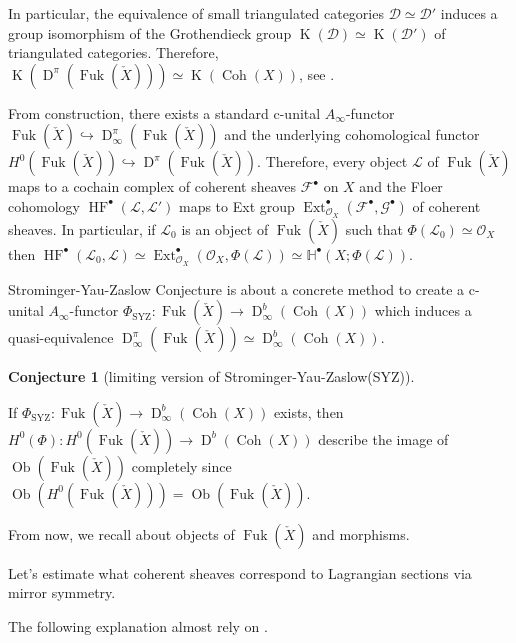 \documentclass[a4paper,dvipdfmx,reqno,12pt]{amsart}
\theoremstyle{definition}
\newtheorem{Conj}[Thm]{Conjecture}
\newcommand{\mb}[1]{\mathbb{#1}}%
\newcommand{\mcal}[1]{\mathcal{#1}}%
\newcommand{\opn}[1]{\operatorname{#1}}
\newcommand{\hookto}{\hookrightarrow}
\numberwithin{equation}{section}
\begin{document}
In particular, the equivalence of small triangulated categories
$\mcal{D}\simeq \mcal{D}'$ induces a group isomorphism of
the Grothendieck group $\opn{K}(\mcal{D})\simeq \opn{K}(\mcal{D}')$
of triangulated categories.
Therefore, $\opn{K}(\opn{D}^{\pi}(\opn{Fuk}(\check{X})))\simeq \opn{K}(\opn{Coh}(X))$, see \cite[Exercise I.27]{}.

From construction, there exists a standard c-unital $A_{\infty}$-functor $\opn{Fuk}(\check{X})\hookto \opn{D}^{\pi}_{\infty}(\opn{Fuk}(\check{X}))$ and the underlying cohomological functor $H^{0}(\opn{Fuk}(\check{X})) \hookto \opn{D}^{\pi}(\opn{Fuk}(\check{X}))$.
Therefore, every object $\mathscr{L}$ of $\opn{Fuk}(\check{X})$
maps to a cochain complex of coherent sheaves $\mcal{F}^{\bullet}$
on $X$ and the Floer cohomology
$\opn{HF}^{\bullet}(\mathscr{L},\mathscr{L}')$
maps to Ext group
$\opn{Ext}^{\bullet}_{\mcal{O}_X}(\mcal{F}^{\bullet},
  \mcal{G}^{\bullet})$ of coherent sheaves.
In particular, if $\mathscr{L}_0$ is an object of
$\opn{Fuk}(\check{X})$ such that $\Phi(\mathscr{L}_0)
  \simeq \mcal{O}_X$ then
$\opn{HF}^{\bullet}(\mathscr{L}_0,\mathscr{L})\simeq
  \opn{Ext}^{\bullet}_{\mcal{O}_X}(\mcal{O}_X,\Phi(\mathscr{L}))\simeq
  \mb{H}^{\bullet}(X;\Phi(\mathscr{L}))$.



Strominger-Yau-Zaslow Conjecture is about a concrete method to create a c-unital $A_{\infty}$-functor $\Phi_{\opn{SYZ}}: \opn{Fuk}(\check{X})\to \opn{D}^{b}_{\infty}(\opn{Coh}(X))$ which induces a quasi-equivalence $\opn{D}^{\pi}_{\infty}(\opn{Fuk}(\check{X}))\simeq \opn{D}^{b}_{\infty}(\opn{Coh}(X))$.
\cite{stromingerMirrorSymmetryTduality1996}

\begin{Conj}[limiting version of Strominger-Yau-Zaslow(SYZ)]

\end{Conj}
If $\Phi_{\opn{SYZ}}: \opn{Fuk}(\check{X})\to \opn{D}^{b}_{\infty}(\opn{Coh}(X))$ exists, then $H^{0}(\Phi): H^{0}(\opn{Fuk}(\check{X}))\to \opn{D}^{b}(\opn{Coh}(X))$
describe the image of $\opn{Ob}(\opn{Fuk}(\check{X}))$ completely since $\opn{Ob}(H^{0}(\opn{Fuk}(\check{X})))=\opn{Ob}(\opn{Fuk}(\check{X}))$.

From now, we recall about objects of $\opn{Fuk}(\check{X})$ and morphisms.

Let's estimate what coherent sheaves correspond to Lagrangian sections via mirror symmetry.

The following explanation almost rely on \cite{MR3848738}.
\end{document}
